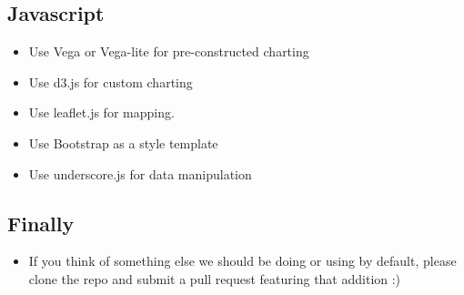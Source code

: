 \documentclass[]{book}
\providecommand{\tightlist}{%
  \setlength{\itemsep}{0pt}\setlength{\parskip}{0pt}}
\begin{document}
\hypertarget{javascript}{%
\subsection{Javascript}\label{javascript}}

\begin{itemize}
\tightlist
\item
  Use Vega or Vega-lite for pre-constructed charting
\item
  Use d3.js for custom charting
\item
  Use leaflet.js for mapping.
\item
  Use Bootstrap as a style template
\item
  Use underscore.js for data manipulation
\end{itemize}

\hypertarget{finally}{%
\subsection{Finally}\label{finally}}

\begin{itemize}
\tightlist
\item
  If you think of something else we should be doing or using by default, please clone the repo and submit a pull request featuring that addition :)
\end{itemize}
\end{document}
